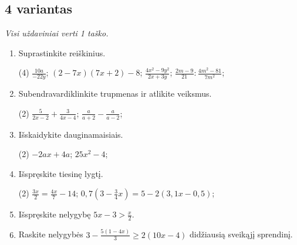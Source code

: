 \documentclass[a4paper]{article}
\begin{document}
\subsection*{4 variantas}

\textit{Visi uždaviniai verti 1 taško.}

\begin{enumerate}
      \item Suprastinkite reiškinius.
            \begin{tasks}[item-format={\normalfont}, after-item-skip=2mm](4)
                  \task $\frac{10a}{-22y}$;
                  \task $(2-7x)(7x+2)-8$;
                  \task $\frac{4x^2-9y^2}{2x+3y}$;
                  \task $\frac{2m-9}{21}:\frac{4m^2-81}{7m^2}$;
            \end{tasks}

      \item Subendravardiklinkite trupmenas ir atlikite veiksmus.
            \begin{tasks}[item-format={\normalfont}, after-item-skip=2mm](2)
                  \task $\frac{5}{2x-2}+\frac{3}{4x-4}$;
                  \task $\frac{a}{a+2}-\frac{a}{a-2}$;
            \end{tasks}

      \item Išskaidykite dauginamaisiais.
            \begin{tasks}[item-format={\normalfont}, after-item-skip=2mm](2)
                  \task $-2ax+4a$;
                  \task $25x^2-4$;
            \end{tasks}

      \item Išspręskite tiesinę lygtį.
            \begin{tasks}[item-format={\normalfont}, after-item-skip=2mm](2)
                  \task $\frac{3x}{2}=\frac{4x}{7}-14$;
                  \task $0,7(3-\frac{3}{4}x)=5-2(3,1x-0,5)$;
            \end{tasks}

      \item Išspręskite nelygybę $5x-3>\frac{x}{2}$.
      \item Raskite nelygybės $3-\frac{5(1-4x)}{3}\geq2(10x-4)$ didžiausią sveikąjį sprendinį.
\end{enumerate}
\end{document}
